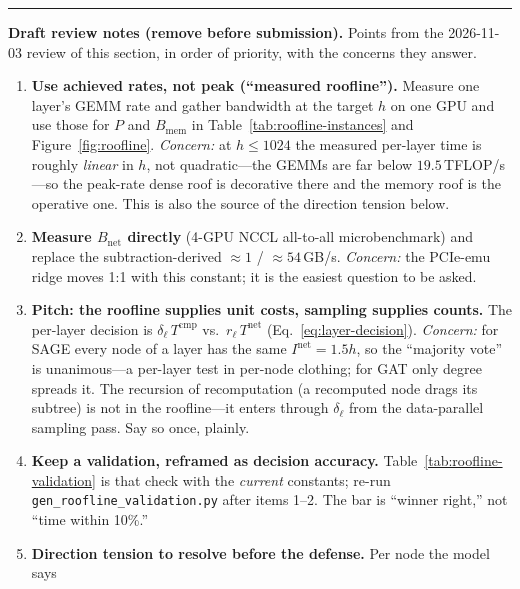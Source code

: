 \noindent\rule{\linewidth}{0.8pt}
{\footnotesize
\noindent\textbf{\color{red}Draft review notes (remove before submission).} Points from the
2026-11-03 review of this section, in order of priority, with the concerns they answer.
\begin{enumerate}\itemsep2pt
  \item \textbf{Use achieved rates, not peak (``measured roofline'').} Measure one layer's GEMM rate
        and gather bandwidth at the target $h$ on one GPU and use those for $P$ and
        $B_{\mathrm{mem}}$ in Table~\ref{tab:roofline-instances} and Figure~\ref{fig:roofline}.
        \emph{Concern:} at $h\le 1024$ the measured per-layer time is roughly \emph{linear} in $h$,
        not quadratic---the GEMMs are far below $19.5$\,TFLOP/s---so the peak-rate dense roof is
        decorative there and the memory roof is the operative one. This is also the source of the
        direction tension below.
  \item \textbf{Measure $B_{\mathrm{net}}$ directly} (4-GPU NCCL all-to-all microbenchmark) and
        replace the subtraction-derived $\approx 1$ / $\approx 54$\,GB/s. \emph{Concern:} the PCIe-emu
        ridge moves 1:1 with this constant; it is the easiest question to be asked.
  \item \textbf{Pitch: the roofline supplies unit costs, sampling supplies counts.} The per-layer
        decision is $\delta_\ell\,T^{\mathrm{cmp}}$ vs.\ $r_\ell\,T^{\mathrm{net}}$
        (Eq.~\eqref{eq:layer-decision}). \emph{Concern:} for SAGE every node of a layer has the same
        $I^{\mathrm{net}}=1.5h$, so the ``majority vote'' is unanimous---a per-layer test in per-node
        clothing; for GAT only degree spreads it. The recursion of recomputation (a recomputed node
        drags its subtree) is not in the roofline---it enters through $\delta_\ell$ from the
        data-parallel sampling pass. Say so once, plainly.
  \item \textbf{Keep a validation, reframed as decision accuracy.}
        Table~\ref{tab:roofline-validation} is that check with the \emph{current} constants; re-run
        \texttt{gen\_roofline\_validation.py} after items 1--2. The bar is ``winner right,'' not
        ``time within 10\%.''
  \item \textbf{Direction tension to resolve before the defense.} Per node the model says

\end{enumerate}}
